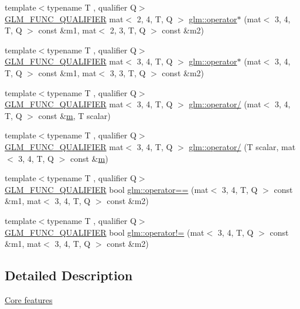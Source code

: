 \begin{DoxyCompactItemize}
\item 
{\footnotesize template$<$typename T , qualifier Q$>$ }\\\hyperlink{setup_8hpp_a33fdea6f91c5f834105f7415e2a64407}{G\+L\+M\+\_\+\+F\+U\+N\+C\+\_\+\+Q\+U\+A\+L\+I\+F\+I\+ER} mat$<$ 2, 4, T, Q $>$ \hyperlink{namespaceglm_a3e4a88d6df1e21560800d7dd5ccd471c}{glm\+::operator$\ast$} (mat$<$ 3, 4, T, Q $>$ const \&m1, mat$<$ 2, 3, T, Q $>$ const \&m2)
\item 
{\footnotesize template$<$typename T , qualifier Q$>$ }\\\hyperlink{setup_8hpp_a33fdea6f91c5f834105f7415e2a64407}{G\+L\+M\+\_\+\+F\+U\+N\+C\+\_\+\+Q\+U\+A\+L\+I\+F\+I\+ER} mat$<$ 3, 4, T, Q $>$ \hyperlink{namespaceglm_ac37ea54112e67cd7577cb6a1a7c6bee5}{glm\+::operator$\ast$} (mat$<$ 3, 4, T, Q $>$ const \&m1, mat$<$ 3, 3, T, Q $>$ const \&m2)
\item 
{\footnotesize template$<$typename T , qualifier Q$>$ }\\\hyperlink{setup_8hpp_a33fdea6f91c5f834105f7415e2a64407}{G\+L\+M\+\_\+\+F\+U\+N\+C\+\_\+\+Q\+U\+A\+L\+I\+F\+I\+ER} mat$<$ 3, 4, T, Q $>$ \hyperlink{namespaceglm_ac945990f829bca6745446d031f2fa5f5}{glm\+::operator/} (mat$<$ 3, 4, T, Q $>$ const \&\hyperlink{_s_d_l__opengl__glext_8h_af593500c283bf1a787a6f947f503a5c2}{m}, T scalar)
\item 
{\footnotesize template$<$typename T , qualifier Q$>$ }\\\hyperlink{setup_8hpp_a33fdea6f91c5f834105f7415e2a64407}{G\+L\+M\+\_\+\+F\+U\+N\+C\+\_\+\+Q\+U\+A\+L\+I\+F\+I\+ER} mat$<$ 3, 4, T, Q $>$ \hyperlink{namespaceglm_a82d79d8121288d008678655f354e8466}{glm\+::operator/} (T scalar, mat$<$ 3, 4, T, Q $>$ const \&\hyperlink{_s_d_l__opengl__glext_8h_af593500c283bf1a787a6f947f503a5c2}{m})
\item 
{\footnotesize template$<$typename T , qualifier Q$>$ }\\\hyperlink{setup_8hpp_a33fdea6f91c5f834105f7415e2a64407}{G\+L\+M\+\_\+\+F\+U\+N\+C\+\_\+\+Q\+U\+A\+L\+I\+F\+I\+ER} bool \hyperlink{namespaceglm_ad06d69260cdcbdeca32e7577d667b95d}{glm\+::operator==} (mat$<$ 3, 4, T, Q $>$ const \&m1, mat$<$ 3, 4, T, Q $>$ const \&m2)
\item 
{\footnotesize template$<$typename T , qualifier Q$>$ }\\\hyperlink{setup_8hpp_a33fdea6f91c5f834105f7415e2a64407}{G\+L\+M\+\_\+\+F\+U\+N\+C\+\_\+\+Q\+U\+A\+L\+I\+F\+I\+ER} bool \hyperlink{namespaceglm_aedafadf9cc6945a030e2c69bdd7e2744}{glm\+::operator!=} (mat$<$ 3, 4, T, Q $>$ const \&m1, mat$<$ 3, 4, T, Q $>$ const \&m2)
\end{DoxyCompactItemize}


\subsection{Detailed Description}
\hyperlink{group__core}{Core features} 